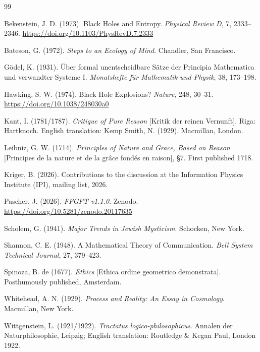 \begin{thebibliography}{99}

Bekenstein, J. D. (1973). Black Holes and Entropy. \emph{Physical Review D}, 7, 2333--2346. \url{https://doi.org/10.1103/PhysRevD.7.2333}

Bateson, G. (1972). \emph{Steps to an Ecology of Mind}. Chandler, San Francisco.

Gödel, K. (1931). Über formal unentscheidbare Sätze der Principia Mathematica und verwandter Systeme I. \emph{Monatshefte für Mathematik und Physik}, 38, 173--198.

Hawking, S. W. (1974). Black Hole Explosions? \emph{Nature}, 248, 30--31. \url{https://doi.org/10.1038/248030a0}

Kant, I. (1781/1787). \emph{Critique of Pure Reason} [Kritik der reinen Vernunft]. Riga: Hartknoch. English translation: Kemp Smith, N. (1929). Macmillan, London.

Leibniz, G. W. (1714). \emph{Principles of Nature and Grace, Based on Reason} [Principes de la nature et de la grâce fondés en raison], §7. First published 1718.

Kriger, B. (2026). Contributions to the discussion at the Information Physics Institute (IPI), mailing list, 2026.

Pascher, J. (2026). \emph{FFGFT v1.1.0}. Zenodo. \url{https://doi.org/10.5281/zenodo.20117635}

Scholem, G. (1941). \emph{Major Trends in Jewish Mysticism}. Schocken, New York.

Shannon, C. E. (1948). A Mathematical Theory of Communication. \emph{Bell System Technical Journal}, 27, 379--423.

Spinoza, B. de (1677). \emph{Ethics} [Ethica ordine geometrico demonstrata]. Posthumously published, Amsterdam.

Whitehead, A. N. (1929). \emph{Process and Reality: An Essay in Cosmology}. Macmillan, New York.

Wittgenstein, L. (1921/1922). \emph{Tractatus logico-philosophicus}. Annalen der Naturphilosophie, Leipzig; English translation: Routledge \& Kegan Paul, London 1922.

\end{thebibliography}
